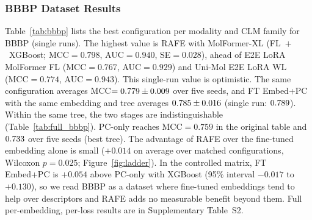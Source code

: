 \documentclass[pdflatex,sn-mathphys-num]{sn-jnl}%
\begin{document}
\subsubsection{BBBP Dataset Results}
Table~\ref{tab:bbbp} lists the best configuration per modality and CLM family for BBBP (single runs). The highest value is RAFE with MolFormer-XL (FL~$+$~XGBoost; MCC$=0.798$, AUC$=0.940$, SE$=0.028$), ahead of E2E LoRA MolFormer FL (MCC$=0.767$, AUC$=0.929$) and Uni-Mol E2E LoRA WL (MCC$=0.774$, AUC$=0.943$). This single-run value is optimistic. The same configuration averages MCC$=0.779 \pm 0.009$ over five seeds, and FT Embed+PC with the same embedding and tree averages $0.785 \pm 0.016$ (single run: $0.789$). Within the same tree, the two stages are indistinguishable (Table~\ref{tab:full_bbbp}). PC-only reaches MCC$=0.759$ in the original table and $0.733$ over five seeds (best tree). The advantage of RAFE over the fine-tuned embedding alone is small ($+0.014$ on average over matched configurations, Wilcoxon $p=0.025$; Figure~\ref{fig:ladder}). In the controlled matrix, FT Embed+PC is $+0.054$ above PC-only with XGBoost (95\% interval $-0.017$ to $+0.130$), so we read BBBP as a dataset where fine-tuned embeddings tend to help over descriptors and RAFE adds no measurable benefit beyond them. Full per-embedding, per-loss results are in Supplementary Table~S2.
\end{document}
